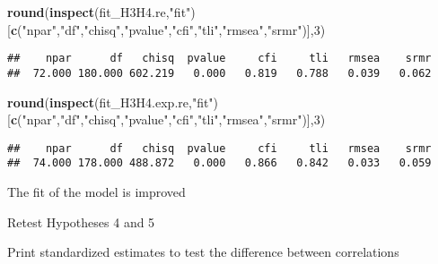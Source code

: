 \documentclass[
]{article}
\newenvironment{Shaded}{\begin{snugshade}}{\end{snugshade}}
\newcommand{\DecValTok}[1]{\textcolor[rgb]{0.00,0.00,0.81}{#1}}
\newcommand{\KeywordTok}[1]{\textcolor[rgb]{0.13,0.29,0.53}{\textbf{#1}}}
\newcommand{\NormalTok}[1]{#1}
\newcommand{\OperatorTok}[1]{\textcolor[rgb]{0.81,0.36,0.00}{\textbf{#1}}}
\newcommand{\StringTok}[1]{\textcolor[rgb]{0.31,0.60,0.02}{#1}}
\begin{document}
\begin{Shaded}
\begin{Highlighting}[]
\KeywordTok{round}\NormalTok{(}\KeywordTok{inspect}\NormalTok{(fit_H3H4.re,}\StringTok{"fit"}\NormalTok{)}
\NormalTok{      [}\KeywordTok{c}\NormalTok{(}\StringTok{"npar"}\NormalTok{,}\StringTok{"df"}\NormalTok{,}\StringTok{"chisq"}\NormalTok{,}\StringTok{"pvalue"}\NormalTok{,}\StringTok{"cfi"}\NormalTok{,}\StringTok{"tli"}\NormalTok{,}\StringTok{"rmsea"}\NormalTok{,}\StringTok{"srmr"}\NormalTok{)],}\DecValTok{3}\NormalTok{)}
\end{Highlighting}
\end{Shaded}

\begin{verbatim}
##    npar      df   chisq  pvalue     cfi     tli   rmsea    srmr 
##  72.000 180.000 602.219   0.000   0.819   0.788   0.039   0.062
\end{verbatim}

\begin{Shaded}
\begin{Highlighting}[]
\KeywordTok{round}\NormalTok{(}\KeywordTok{inspect}\NormalTok{(fit_H3H4.exp.re,}\StringTok{"fit"}\NormalTok{)}
\NormalTok{      [}\KeywordTok{c}\NormalTok{(}\StringTok{"npar"}\NormalTok{,}\StringTok{"df"}\NormalTok{,}\StringTok{"chisq"}\NormalTok{,}\StringTok{"pvalue"}\NormalTok{,}\StringTok{"cfi"}\NormalTok{,}\StringTok{"tli"}\NormalTok{,}\StringTok{"rmsea"}\NormalTok{,}\StringTok{"srmr"}\NormalTok{)],}\DecValTok{3}\NormalTok{)}
\end{Highlighting}
\end{Shaded}

\begin{verbatim}
##    npar      df   chisq  pvalue     cfi     tli   rmsea    srmr 
##  74.000 178.000 488.872   0.000   0.866   0.842   0.033   0.059
\end{verbatim}

The fit of the model is improved

Retest Hypotheses 4 and 5

Print standardized estimates to test the difference between correlations

\begin{Shaded}
\end{Shaded}
\end{document}
